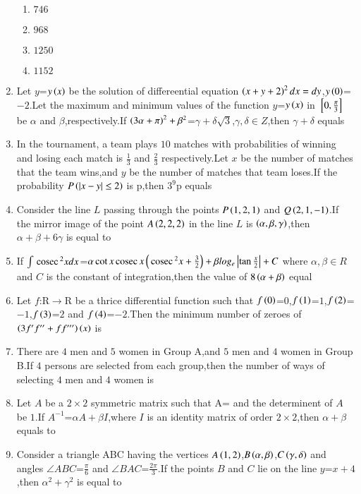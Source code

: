 \documentclass[journal]{IEEEtran}
\begin{document}
\begin{enumerate}[start=16]
    \begin{enumerate}
        \item $746$
        \item $968$
        \item $1250$
        \item $1152$
    \end{enumerate}
    \item Let $y$=$y\left(x\right)$ be the solution of differeential equation $\left(x+y+2\right)^2dx=dy$,$y\left(0\right)$=$-2$.Let the maximum and minimum values of the function $y$=$y\left(x\right)$ in ${}\left[0,\frac{\pi}{3}\right]$ be $\alpha$ and $\beta$,respectively.If $\left(3\alpha+\pi\right)^2+\beta^2$=$\gamma+\delta\sqrt{3}$,$\gamma,\delta \in Z$,then $\gamma+\delta$ equals
    \item In the tournament, a team plays $10$ matches with probabilities of winning and losing each match is $\frac{1}{3}$ and $\frac{2}{3}$ respectively.Let $x$ be the number of matches that the team wins,and $y$ be the number of matches that team loses.If the probability $P\left(\left\vert x-y\right\vert \leq 2\right)$ is p,then $3^9$p equals
    \item Consider the line $L$ passing through the points $P\left(1,2,1\right)$ and $Q\left(2,1,-1\right)$.If the mirror image of the point $A\left(2,2,2\right)$ in the line $L$ is $\left(\alpha,\beta,\gamma\right)$,then $\alpha+\beta+6\gamma$ is equal to
    \item If $\int\,\text{cosec}\,^2{x}dx$=$\alpha\cot{x}\,\text{cosec}\,{x}\left(\,\text{cosec}\,^2{x}+\frac{3}{2}\right)+\beta log_e\left\vert\tan{\frac{x}{2}}\right\vert+C$ where $\alpha,\beta \in R$ and $C$ is the constant of integration,then the value of $8\left(\alpha+\beta\right)$ equal
    \item Let $f$:R$\to$R be a thrice differential function such that $f\left(0\right)$=$0$,$f\left(1\right)$=$1$,$f\left(2\right)$=$-1$,$f\left(3\right)$=$2$ and $f\left(4\right)$=$-2$.Then the minimum number of zeroes of $\left(3f^{\prime}f^{\prime\prime}+ff^{\prime\prime\prime}\right)\left(x\right)$ is 
    \item There are $4$ men and $5$ women in Group A,and $5$ men and $4$ women in Group B.If $4$ persons are selected from each group,then the number of ways of selecting $4$ men and $4$ women is
    \item Let $A$ be a $2\times2$ symmetric matrix such that A= and the determinent of $A$ be $1$.If $A^{-1}$=$\alpha A+\beta I$,where $I$ is an identity matrix of order $2\times2$,then $\alpha+\beta$ equals to
    \item Consider a triangle ABC having the vertices $A\left(1,2\right)$,$B\left(\alpha,\beta\right)$,$C\left(\gamma,\delta\right)$ and angles $\angle ABC$=$\frac{\pi}{6}$ and $\angle BAC$=$\frac{2\pi}{3}$.If the points $B$ and $C$ lie on the line $y$=$x+4$,then $\alpha^2+\gamma^2$ is equal to

\end{enumerate}
\end{document}
